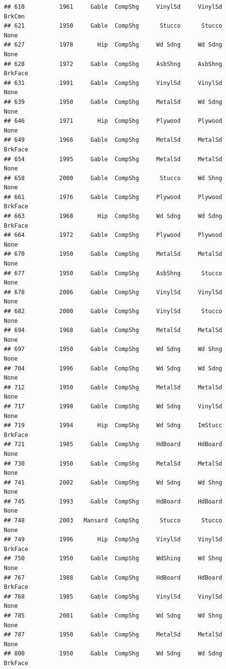 \documentclass[]{article}
\begin{document}
\begin{verbatim}
## 610          1961     Gable  CompShg     VinylSd     VinylSd     BrkCmn
## 621          1950     Gable  CompShg      Stucco      Stucco       None
## 627          1978       Hip  CompShg     Wd Sdng     Wd Sdng       None
## 628          1972     Gable  CompShg     AsbShng     AsbShng    BrkFace
## 631          1991     Gable  CompShg     VinylSd     VinylSd       None
## 639          1950     Gable  CompShg     MetalSd     Wd Sdng       None
## 646          1971       Hip  CompShg     Plywood     Plywood       None
## 649          1966     Gable  CompShg     MetalSd     MetalSd    BrkFace
## 654          1995     Gable  CompShg     MetalSd     MetalSd       None
## 658          2000     Gable  CompShg      Stucco     Wd Shng       None
## 661          1976     Gable  CompShg     Plywood     Plywood    BrkFace
## 663          1968       Hip  CompShg     Wd Sdng     Wd Sdng    BrkFace
## 664          1972     Gable  CompShg     Plywood     Plywood       None
## 670          1950     Gable  CompShg     MetalSd     MetalSd       None
## 677          1950     Gable  CompShg     AsbShng      Stucco       None
## 678          2006     Gable  CompShg     VinylSd     VinylSd       None
## 682          2000     Gable  CompShg     VinylSd      Stucco       None
## 694          1968     Gable  CompShg     MetalSd     MetalSd       None
## 697          1950     Gable  CompShg     Wd Sdng     Wd Shng       None
## 704          1996     Gable  CompShg     Wd Sdng     Wd Sdng       None
## 712          1950     Gable  CompShg     MetalSd     MetalSd       None
## 717          1998     Gable  CompShg     Wd Sdng     VinylSd       None
## 719          1994       Hip  CompShg     Wd Sdng     ImStucc    BrkFace
## 721          1985     Gable  CompShg     HdBoard     HdBoard       None
## 730          1950     Gable  CompShg     MetalSd     MetalSd       None
## 741          2002     Gable  CompShg     Wd Sdng     Wd Shng       None
## 745          1993     Gable  CompShg     HdBoard     HdBoard       None
## 748          2003   Mansard  CompShg      Stucco      Stucco       None
## 749          1996       Hip  CompShg     VinylSd     VinylSd    BrkFace
## 750          1950     Gable  CompShg     WdShing     Wd Shng       None
## 767          1988     Gable  CompShg     HdBoard     HdBoard    BrkFace
## 768          1985     Gable  CompShg     VinylSd     VinylSd       None
## 785          2001     Gable  CompShg     Wd Sdng     Wd Shng       None
## 787          1950     Gable  CompShg     MetalSd     MetalSd       None
## 800          1950     Gable  CompShg     Wd Sdng     Wd Sdng    BrkFace

\end{verbatim}
\end{document}
